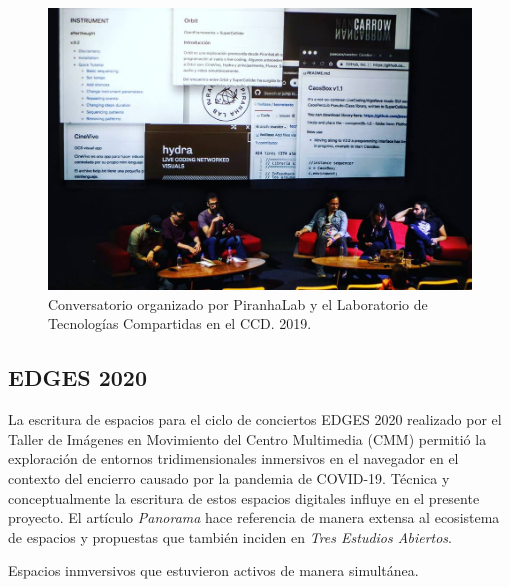 \begin{figure}[tb]
\centering 
\includegraphics[width=\columnwidth]{img/conversatorio.jpg} 
\caption[Conversatorio CCD]{Conversatorio organizado por PiranhaLab y el Laboratorio de Tecnologías Compartidas en el CCD. 2019.} %
\label{fig:gallery} 
\end{figure}

\subsection{EDGES 2020}

La escritura de espacios para el ciclo de conciertos EDGES 2020 realizado por el Taller de Imágenes en Movimiento del Centro Multimedia (CMM) permitió la exploración de entornos tridimensionales inmersivos en el navegador en el contexto del encierro causado por la pandemia de COVID-19. Técnica y conceptualmente la escritura de estos espacios digitales influye en el presente proyecto. El artículo \textit{Panorama} \citep{panoramaArticulo} hace referencia de manera extensa al ecosistema de espacios y propuestas que también inciden en \textit{Tres Estudios Abiertos}.


Espacios inmversivos que estuvieron activos de manera simultánea. 
